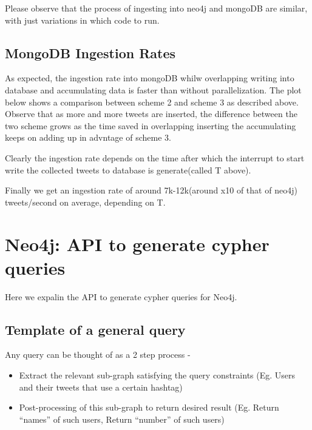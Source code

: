 \documentclass[letterpaper,10pt,english]{sphinxmanual}
\begin{document}
Please observe that the process of ingesting into neo4j and mongoDB are similar, with just variations in which code to run.


\section{MongoDB Ingestion Rates}
\label{\detokenize{mongoDB_data_ingestion:mongodb-ingestion-rates}}
As expected, the ingestion rate into mongoDB whilw overlapping writing into database and accumulating data is faster than without parallelization. The plot below shows a comparison between scheme 2 and scheme 3 as described above. Observe that as more and more tweets are inserted, the difference between the two scheme grows as the time saved in overlapping inserting the accumulating keeps on adding up in advntage of scheme 3.

\noindent{}

Clearly the ingestion rate depends on the time after which the interrupt to start write the collected tweets to database is generate(called T above).

Finally we get an ingestion rate of around 7k-12k(around x10 of that of neo4j) tweets/second on average, depending on T.


\chapter{Neo4j: API to generate cypher queries}
\label{\detokenize{neo4j_query_generation:neo4j-api-to-generate-cypher-queries}}\label{\detokenize{neo4j_query_generation::doc}}
Here we expalin the API to generate cypher queries for Neo4j.


\section{Template of a general query}
\label{\detokenize{neo4j_query_generation:template-of-a-general-query}}
Any query can be thought of as a 2 step process -
\begin{itemize}
\item {} 
Extract the relevant sub-graph satisfying the query constraints (Eg. Users and their tweets that use a certain hashtag)

\item {} 
Post-processing of this sub-graph to return desired result (Eg. Return “names” of such users, Return “number” of such users)

\end{itemize}
\end{document}
